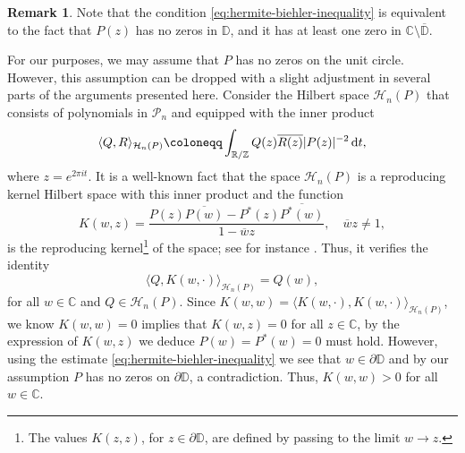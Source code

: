 \documentclass[reqno, a4paper]{amsart}
\def\C{\mathbb{C}}
\def\T{\mathbb{R}/\mathbb{Z}}
\renewcommand{\d}{\text{\rm d}}
\newcommand{\dD}{\partial\mathbb{D}}
\theoremstyle{plain}
\theoremstyle{definition}
\theoremstyle{remarkstyle}
\newtheorem*{remark}{Remark}
\numberwithin{equation}{section}
\begin{document}
\begin{remark}\label{rem:hermite-biehler-condition-for-zeros}
    Note that the condition \eqref{eq:hermite-biehler-inequality} is equivalent to the fact that $P(z)$ has no zeros in $\mathbb{D}$, and it has at least one zero in $\C\setminus \overline{\mathbb{D}}$.
\end{remark}
  For our purposes, we may assume that $P$ has no zeros on the unit circle. However, this assumption can be dropped with a slight adjustment in several parts of the arguments presented here. Consider the Hilbert space $\mathcal{H}_n(P)$ that consists of polynomials in $\mathcal{P}_n$ and equipped with the inner product
\begin{equation*}
    \langle Q, R \rangle_{\mathcal{H}_n(P)}\coloneqq \int_{\T} Q(z) \overline{R(z)} |P(z)|^{-2}\, \d t,
\end{equation*}
where $z=e^{2\pi i t}$. It is a well-known fact that the space $\mathcal{H}_n(P)$ is a reproducing kernel Hilbert space with this inner product and the function
\begin{equation}\label{eq:reproducing-kernel}
    K(w, z)=\frac{P(z)\overline{P(w)}-P^*(z)\overline{P^*(w)}}{1-\overline{w}z}, \quad \overline{w}z\neq 1,
\end{equation}
is the reproducing kernel\footnote{The values $K(z, z)$, for $z\in \dD$, are defined by passing to the limit $w\to z$.} of the space; see for instance \cite{LiHamiltonRiemannHypothesisPolynomialsOrthogonal1994}.  Thus, it verifies the identity
\begin{equation*}
    \langle Q, K(w, \cdot)\rangle_{\mathcal{H}_n(P)}=Q(w),
\end{equation*}
for all $w\in \C$ and $Q\in \mathcal{H}_n(P)$. Since $K(w, w)=\langle K(w, \cdot), K(w, \cdot)\rangle_{\mathcal{H}_n(P)}$, we know $K(w, w)=0$ implies that $K(w, z)=0$ for all $z\in \mathbb{C}$, by the expression of $K(w, z)$ we deduce $P(w)=P^*(w)=0$ must hold. However, using the estimate \eqref{eq:hermite-biehler-inequality} we see that $w\in \dD$ and by our assumption $P$ has no zeros on $\dD$, a contradiction. Thus, $K(w, w)>0$ for all $w\in \C$.

\medskip
\end{document}
